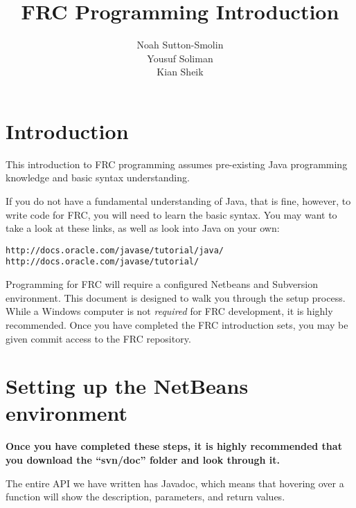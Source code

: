 \documentclass[a4paper]{article}
\title{FRC Programming Introduction}
\author{Noah Sutton-Smolin\\Yousuf Soliman\\Kian Sheik}
\begin{document}
\maketitle

\section{Introduction}

This introduction to FRC programming assumes pre-existing Java programming knowledge and basic syntax understanding.

If you do not have a fundamental understanding of Java, that is fine, however, to write code for FRC, you will need to learn the basic syntax. You may want to take a look at these links, as well as look into Java on your own:

\begin{verbatim}http://docs.oracle.com/javase/tutorial/java/
http://docs.oracle.com/javase/tutorial/\end{verbatim}

Programming for FRC will require a configured Netbeans and Subversion environment. This document is designed to walk you through the setup process. While a Windows computer is not \textit{required} for FRC development, it is highly recommended. Once you have completed the FRC introduction sets, you may be given commit access to the FRC repository.

\section{Setting up the NetBeans environment}

\textbf{Once you have completed these steps, it is highly recommended that you download the ``svn/doc'' folder and look through it.}

The entire API we have written has Javadoc, which means that hovering over a function will show the description, parameters, and return values.
\end{document}
